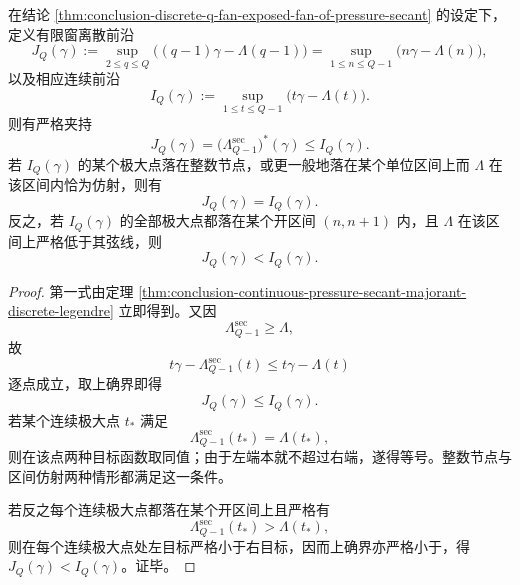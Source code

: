 \begin{theorem}\label{thm:conclusion-discrete-chernoff-fan-strictly-sandwiched-by-continuous-legendre}
在结论 \ref{thm:conclusion-discrete-q-fan-exposed-fan-of-pressure-secant} 的设定下，定义有限窗离散前沿
\[
J_Q(\gamma)
:=
\sup_{2\le q\le Q}\bigl((q-1)\gamma-\Lambda(q-1)\bigr)
=
\sup_{1\le n\le Q-1}\bigl(n\gamma-\Lambda(n)\bigr),
\]
以及相应连续前沿
\[
I_Q(\gamma):=
\sup_{1\le t\le Q-1}\bigl(t\gamma-\Lambda(t)\bigr).
\]
则有严格夹持
\[
J_Q(\gamma)
=
\bigl(\Lambda_{Q-1}^{\mathrm{sec}}\bigr)^\ast(\gamma)
\le
I_Q(\gamma).
\]
若 \(I_Q(\gamma)\) 的某个极大点落在整数节点，或更一般地落在某个单位区间上而 \(\Lambda\) 在该区间内恰为仿射，则有
\[
J_Q(\gamma)=I_Q(\gamma).
\]
反之，若 \(I_Q(\gamma)\) 的全部极大点都落在某个开区间 \((n,n+1)\) 内，且 \(\Lambda\) 在该区间上严格低于其弦线，则
\[
J_Q(\gamma)<I_Q(\gamma).
\]
\end{theorem}
\begin{proof}
第一式由定理 \ref{thm:conclusion-continuous-pressure-secant-majorant-discrete-legendre} 立即得到。又因
\[
\Lambda_{Q-1}^{\mathrm{sec}}\ge \Lambda,
\]
故
\[
t\gamma-\Lambda_{Q-1}^{\mathrm{sec}}(t)\le t\gamma-\Lambda(t)
\]
逐点成立，取上确界即得
\[
J_Q(\gamma)\le I_Q(\gamma).
\]
若某个连续极大点 \(t_\ast\) 满足
\[
\Lambda_{Q-1}^{\mathrm{sec}}(t_\ast)=\Lambda(t_\ast),
\]
则在该点两种目标函数取同值；由于左端本就不超过右端，遂得等号。整数节点与区间仿射两种情形都满足这一条件。

若反之每个连续极大点都落在某个开区间上且严格有
\[
\Lambda_{Q-1}^{\mathrm{sec}}(t_\ast)>\Lambda(t_\ast),
\]
则在每个连续极大点处左目标严格小于右目标，因而上确界亦严格小于，得 \(J_Q(\gamma)<I_Q(\gamma)\)。证毕。
\end{proof}

